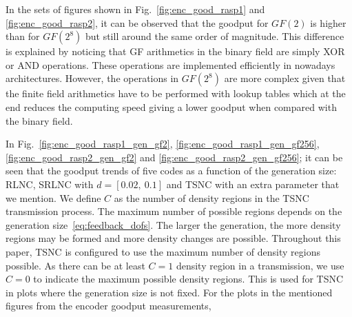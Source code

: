 In the sets of figures shown in Fig.~\ref{fig:enc_good_rasp1} and
\ref{fig:enc_good_rasp2}, it can be observed that the goodput for $GF(2)$
is higher than for $GF(2^8)$ but still around the same order of magnitude.
This difference is explained by noticing that \ac{GF} arithmetics in the
binary field are simply XOR or AND operations. These operations are
implemented efficiently in nowadays architectures.
However, the operations in $GF(2^8)$
are more complex given that the finite field arithmetics have to be
performed with lookup tables which at the end reduces the computing
speed giving a lower goodput when compared with the binary field.

In Fig.~\ref{fig:enc_good_rasp1_gen_gf2}, \ref{fig:enc_good_rasp1_gen_gf256},
\ref{fig:enc_good_rasp2_gen_gf2} and \ref{fig:enc_good_rasp2_gen_gf256};
it can be seen that the goodput trends of five codes as a function of
the generation size: \ac{RLNC}, \ac{SRLNC} with $d = [0.02,\ 0.1]$
and \ac{TSNC} with an extra parameter that we mention. We define
$C$ as the number of density regions in the \ac{TSNC} transmission
process. The maximum number of possible regions depends
on the generation size~\eqref{eq:feedback_dofs}.
The larger the generation, the more density regions may
be formed and more density changes are possible.
Throughout this paper, \ac{TSNC} is configured to use the maximum number
of density regions possible. 
As there can be at least $C=1$ density region in a transmission, we use
$C=0$ to indicate the maximum possible density regions. This is
used for \ac{TSNC} in plots where the generation size is not fixed.
%
%
For the plots in the mentioned figures from the encoder goodput measurements,
